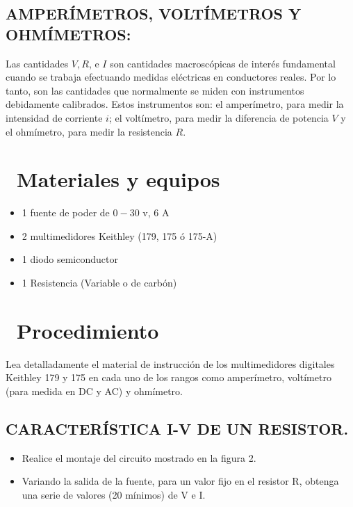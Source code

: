 \documentclass[11pt,a4paper]{article}
\newcommand{\iconotexto}[2]{\textcolor{cyanNeon}{\faIcon{#1}}~#2}
\begin{document}
\subsection*{AMPERÍMETROS, VOLTÍMETROS Y OHMÍMETROS:}

Las cantidades $V, R$, e $I$ son cantidades macroscópicas de interés fundamental cuando se trabaja efectuando medidas eléctricas en conductores reales. Por lo tanto, son las cantidades que normalmente se miden con instrumentos debidamente calibrados. Estos instrumentos son: el amperímetro, para medir la intensidad de corriente $i$; el voltímetro, para medir la diferencia de potencia $V$ y el ohmímetro, para medir la resistencia $R$.

\section{\iconotexto{box-open}{Materiales y equipos}}

\begin{itemize}[leftmargin=1.4em,itemsep=2pt,topsep=3pt]
  \item 1 fuente de poder de $0-30$ v, 6 A
  \item 2 multimedidores Keithley (179, 175 ó 175-A)
  \item 1 diodo semiconductor
  \item 1 Resistencia (Variable o de carbón)
\end{itemize}

\section{\iconotexto{list-ol}{Procedimiento}}

Lea detalladamente el material de instrucción de los multimedidores digitales Keithley 179 y 175 en cada uno de los rangos como amperímetro, voltímetro (para medida en DC y AC) y ohmímetro.

\subsection*{CARACTERÍSTICA I-V DE UN RESISTOR.}

\begin{itemize}[leftmargin=1.4em,itemsep=2pt,topsep=3pt]
  \item Realice el montaje del circuito mostrado en la figura 2.
\end{itemize}

\begin{itemize}[leftmargin=1.4em,itemsep=2pt,topsep=3pt]
  \item Variando la salida de la fuente, para un valor fijo en el resistor R, obtenga una serie de valores (20 mínimos) de V e I.
\end{itemize}
\end{document}
